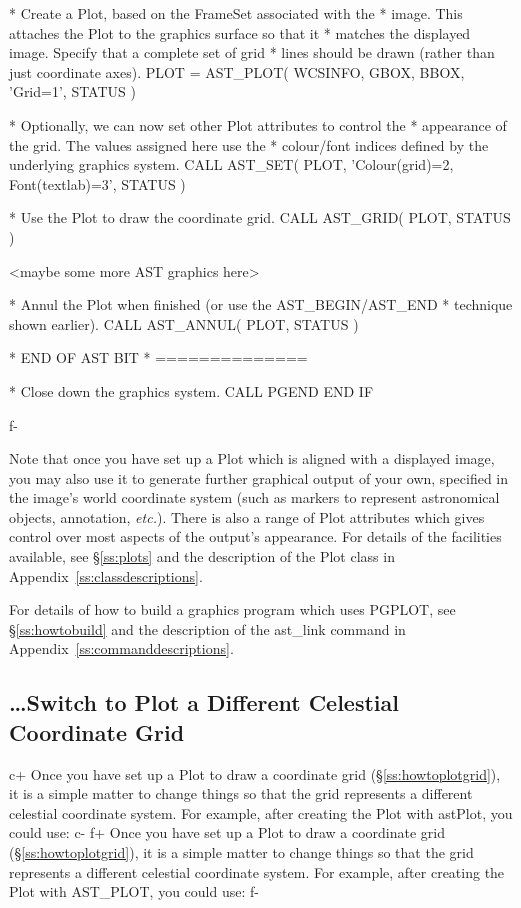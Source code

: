 \documentclass[twoside,11pt]{starlink}
\providecommand{\appref}[1]{Appendix~\ref{#1}}
\providecommand{\secref}[1]{\S\ref{#1}}
\begin{document}
\begin{terminalv}
*  Create a Plot, based on the FrameSet associated with the
*  image. This attaches the Plot to the graphics surface so that it
*  matches the displayed image. Specify that a complete set of grid
*  lines should be drawn (rather than just coordinate axes).
         PLOT = AST_PLOT( WCSINFO, GBOX, BBOX, 'Grid=1', STATUS )

*  Optionally, we can now set other Plot attributes to control the
*  appearance of the grid. The values assigned here use the
*  colour/font indices defined by the underlying graphics system.
         CALL AST_SET( PLOT, 'Colour(grid)=2, Font(textlab)=3', STATUS )

*  Use the Plot to draw the coordinate grid.
         CALL AST_GRID( PLOT, STATUS )

         <maybe some more AST graphics here>

*  Annul the Plot when finished (or use the AST_BEGIN/AST_END
*  technique shown earlier).
         CALL AST_ANNUL( PLOT, STATUS )

*  END OF AST BIT
*  ==============

*  Close down the graphics system.
         CALL PGEND
      END IF
\end{terminalv}
\normalsize
f-

Note that once you have set up a Plot which is aligned with a
displayed image, you may also use it to generate further graphical
output of your own, specified in the image's world coordinate system
(such as markers to represent astronomical objects, annotation,
\emph{etc.}). There is also a range of Plot attributes which gives
control over most aspects of the output's appearance.  For details of
the facilities available, see \secref{ss:plots} and the description of
the Plot class in \appref{ss:classdescriptions}.

For details of how to build a graphics program which uses PGPLOT, see
\secref{ss:howtobuild} and the description of the ast\_link command in
\appref{ss:commanddescriptions}.

\subsection{\label{ss:howtoswitchgrid}\ldots Switch to Plot a Different Celestial Coordinate Grid}

c+
Once you have set up a Plot to draw a coordinate grid
(\secref{ss:howtoplotgrid}), it is a simple matter to change things so
that the grid represents a different celestial coordinate system. For
example, after creating the Plot with astPlot, you could use:
c-
f+
Once you have set up a Plot to draw a coordinate grid
(\secref{ss:howtoplotgrid}), it is a simple matter to change things so
that the grid represents a different celestial coordinate system. For
example, after creating the Plot with AST\_PLOT, you could use:
f-
\end{document}
